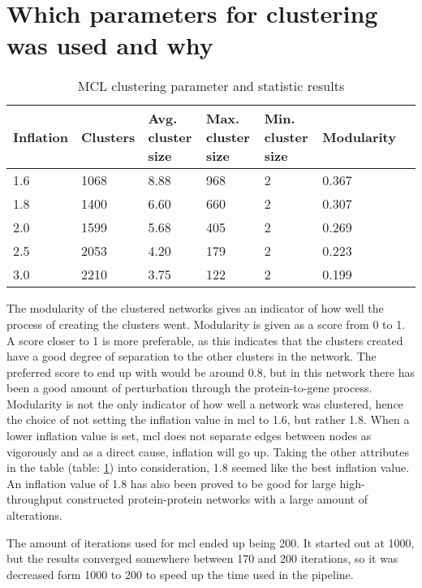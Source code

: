 \section{Which parameters for clustering was used and why}
\begin{table}[H]
    \centering
    \begin{tabular}{| l | p{2cm} | p{2cm} | p{2cm} | p{2cm} | p{2cm} | p{2.1cm} |}
        \hline
        \textbf{Inflation} & \textbf{Clusters} & \textbf{Avg.  cluster size} &
        \textbf{Max. cluster size} & \textbf{Min. cluster size} &
        \textbf{Modularity} \\
        \hline
        1.6 & 1068 & 8.88 & 968 & 2 & 0.367 \\
        1.8 & 1400 & 6.60 & 660 & 2 & 0.307 \\
        2.0 & 1599 & 5.68 & 405 & 2 & 0.269 \\
        2.5 & 2053 & 4.20 & 179 & 2 & 0.223 \\
        3.0 & 2210 & 3.75 & 122 & 2 & 0.199 \\
        \hline
    \end{tabular}
    \caption{MCL clustering parameter and statistic results}
    \label{tab:mcl-inflation}
\end{table}
The modularity of the clustered networks gives an indicator of how well the
process of creating the clusters went. Modularity is given as a score from 0 to
1. A score closer to 1 is more preferable, as this indicates that the clusters
created have a good degree of separation to the other clusters in the network.
The preferred score to end up with would be around 0.8, but in this network
there has been a good amount of perturbation through the protein-to-gene
process. Modularity is not the only indicator of how well a network was
clustered, hence the choice of not setting the inflation value in \gls{mcl} to
1.6, but rather 1.8. When a lower inflation value is set, \gls{mcl} does not
separate edges between nodes as vigorously and as a direct cause, inflation will
go up. Taking the other attributes in the table (table: \ref{tab:mcl-inflation}) into
consideration, 1.8 seemed like the best inflation value. An inflation value of
1.8 has also been proved to be good for large high-throughput constructed
protein-protein networks with a large amount of alterations\cite{mcl-inflation}.

The amount of iterations used for \gls{mcl} ended up being 200. It started out
at 1000, but the results converged somewhere between 170 and 200 iterations, so
it was decreased form 1000 to 200 to speed up the time used in the
\gls{pipeline}.

